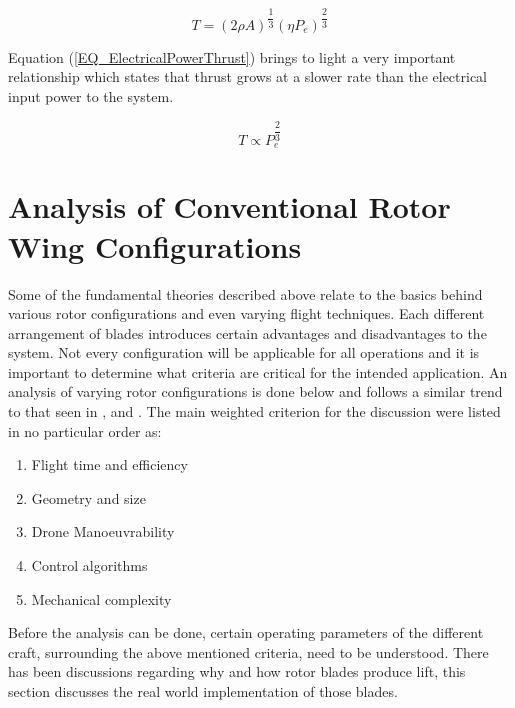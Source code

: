 \begin{equation}
\label{EQ_ElectricalPowerThrust}
T = (2\rho A)^{\dfrac{1}{3}} (\eta P_e)^{\dfrac{2}{3}}
\end{equation}

Equation (\ref{EQ_ElectricalPowerThrust}) brings to light a very important relationship which states that thrust grows at a slower rate than the electrical input power to the system.

\begin{equation*}
T \propto P_e^{\dfrac{2}{3}}
\end{equation*}

\section{Analysis of Conventional Rotor Wing Configurations}

Some of the fundamental theories described above relate to the basics behind various rotor configurations and even varying flight techniques. Each different arrangement of blades introduces certain advantages and disadvantages to the system. Not every configuration will be applicable for all operations and it is important to determine what criteria are critical for the intended application.  An analysis of varying rotor configurations is done below and follows a similar trend to that seen in \cite{RotorConfig}, \cite{Bohorquez} and \cite{NewMAV}. The main weighted criterion for the discussion were listed in no particular order as:

\begin{enumerate}
	\item Flight time and efficiency
	\item Geometry and size
	\item Drone Manoeuvrability
	\item Control algorithms
	\item Mechanical complexity
\end{enumerate}

Before the analysis can be done, certain operating parameters of the different craft, surrounding the above mentioned criteria, need to be understood. There has been discussions regarding why and how rotor blades produce lift, this section discusses the real world implementation of those blades.


